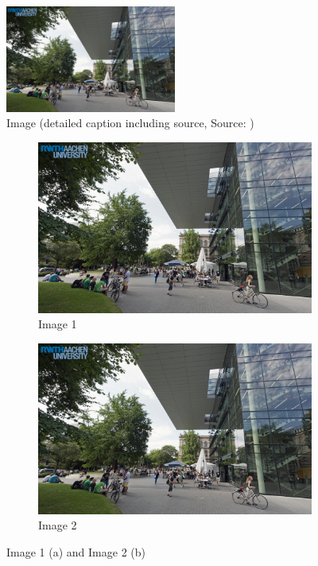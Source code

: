 \begin{figure}[htbp]
	\centering
		\includegraphics[width = 0.5\textwidth]{Contents/Resources/superc.jpeg}
	\caption[Image (short caption without source)]{Image (detailed caption including source, Source: \cite[1]{Sample.2012})}
	\label{fig:a_image}
\end{figure}

\begin{figure}[htbp]
	\centering
	\begin{subfigure}[t]{0.46\textwidth}
		\includegraphics[width = 1\textwidth]{Contents/Resources/superc.jpeg}
		\caption{Image 1}
		\label{fig:image1}
	\end{subfigure}
	\begin{subfigure}[t]{0.46\textwidth}
		\includegraphics[width = 1\textwidth]{Contents/Resources/superc.jpeg}
		\caption{Image 2}
		\label{fig:image2}
	\end{subfigure}
	\caption[Two images]{Image 1 (a) and Image 2 (b)}
	\label{fig:multiple_images}
\end{figure}

